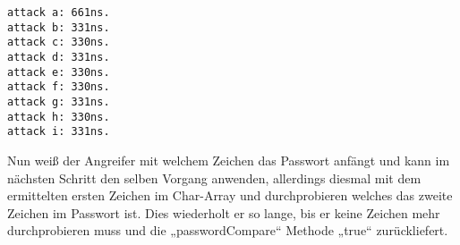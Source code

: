 \documentclass[a4paper,11pt]{scrartcl}
\begin{document}
\begin{verbatim}
attack a: 661ns.
attack b: 331ns.
attack c: 330ns.
attack d: 331ns.
attack e: 330ns.
attack f: 330ns.
attack g: 331ns.
attack h: 330ns.
attack i: 331ns.
\end{verbatim}

Nun weiß der Angreifer mit welchem Zeichen das Passwort anfängt und kann im nächsten Schritt den selben Vorgang anwenden, allerdings diesmal mit dem ermittelten ersten Zeichen im Char-Array und durchprobieren welches das zweite Zeichen im Passwort ist. Dies wiederholt er so lange, bis er keine Zeichen mehr durchprobieren muss und die „passwordCompare“ Methode „true“ zurückliefert.
\end{document}
